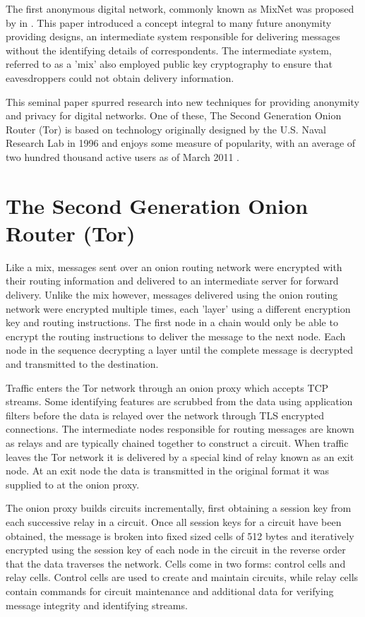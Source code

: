 \documentclass[conference]{IEEEtran}
\begin{document}
The first anonymous digital network, commonly known as MixNet was proposed by
\citeauthor{Chaum:1981p296} in 
\parencite{Chaum:1981p296}. This paper introduced a concept integral to many
future anonymity providing designs, an intermediate system responsible for
delivering messages without the identifying details of correspondents. The
intermediate system, referred to as a 'mix' also employed public key
cryptography to ensure that eavesdroppers could not obtain delivery information.

This seminal paper spurred research into new techniques for providing anonymity
and privacy for digital networks. One of these, The Second Generation Onion
Router (Tor) is based on technology originally designed by the U.S. Naval
Research Lab in 1996 \parencite{Goldschlag:1996wy} and enjoys some measure of
popularity, with an average of two hundred thousand active users as of March
2011 \parencite{The-Tor-Project-Inc.:2011fk}.

\section{The Second Generation Onion Router (Tor)}

Like a mix, messages sent over an onion routing network were encrypted with
their routing information and delivered to an intermediate server for forward
delivery.  Unlike the mix however, messages delivered using the onion routing
network were encrypted multiple times, each 'layer' using a different
encryption key and routing instructions. The first node in a chain would only
be able to encrypt the routing instructions to deliver the message to the next
node. Each node in the sequence decrypting a layer until the complete message
is decrypted and transmitted to the destination.

Traffic enters the Tor network through an onion proxy which accepts TCP streams.
Some identifying features are scrubbed from the data using application filters
before the data is relayed over the network through TLS \parencite{website:TLS}
encrypted connections. The intermediate nodes responsible for routing messages
are known as relays and are typically chained together to construct a circuit.
When traffic leaves the Tor network it is delivered by a special kind of relay
known as an exit node. At an exit node the data is transmitted in the original
format it was supplied to at the onion proxy.

The onion proxy builds circuits incrementally, first obtaining a session key
from each successive relay in a circuit. Once all session keys for a circuit
have been obtained, the message is broken into fixed sized cells of 512 bytes
and iteratively encrypted using the session key of each node in the circuit in
the reverse order that the data traverses the network. Cells come in two forms:
control cells and relay cells. Control cells are used to create and maintain
circuits, while relay cells contain commands for circuit maintenance and
additional data for verifying message integrity and identifying streams.
\end{document}
